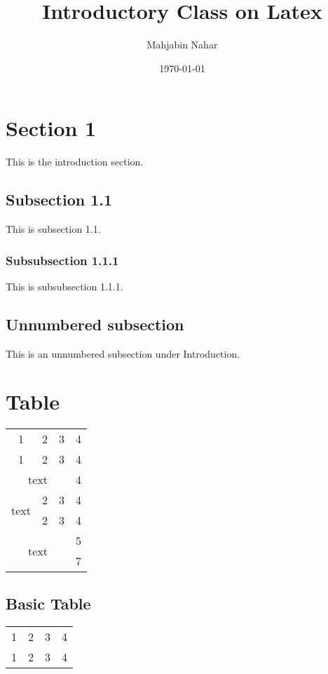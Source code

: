 \documentclass[14pt, a4paper]{article} %
\title{Introductory Class on Latex}
\author{Mahjabin Nahar}
\date{\today}
\begin{document}
\maketitle
\tableofcontents %
\pagebreak %

\section{Section 1}
\label{sec:intro} %
This is the introduction section.


\subsection{Subsection 1.1}
\label{subsec:1.1} %
This is subsection 1.1.


\subsubsection{Subsubsection 1.1.1}
This is subsubsection 1.1.1.


\subsection*{Unnumbered subsection}
This is an unnumbered subsection under Introduction. 

\section{Table}

\begin{tabular}{|c|c|c|c|}
 \hline
	1 & 2 & 3 & 4 \\ 
	\cline{1-3}
	1 & 2 & 3 & 4  \\
	\hline
	\multicolumn{3}{|c|}{text} & 4 \\
	\hline
	\multirow{2}{*}{text} & 2 & 3 & 4\\
	\cline{2-4}
	& 2 & 3 & 4 \\
	\hline
	\multicolumn{3}{|c|}{\multirow{2}{*}{text}} & 5 \\
	\multicolumn{3}{|c|}{} & 7 \\
	\hline
\end{tabular}

\subsection{Basic Table}
\begin{tabular}{|c|ccc|}
	\hline
	1 & 2 & 3 & 4 \\ 
	\cline{1-3}
	1 & 2 & 3 & 4  \\
	\hline

\end{tabular}
\end{document}
